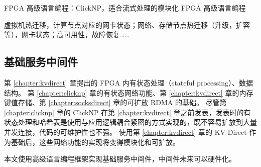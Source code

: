 FPGA 高级语言编程：ClickNP，适合流式处理的模块化 FPGA 高级语言编程

虚拟机热迁移，计算节点对应的网卡状态；网络、存储节点热迁移（升级，扩容等），网卡状态；高可用性，故障恢复……

\subsection{基础服务中间件}



第 \ref{chapter:kvdirect} 章提出的 FPGA 内有状态处理（stateful processing）、数据结构。
第 \ref{chapter:clicknp} 章的有状态网络功能、第 \ref{chapter:kvdirect} 章的内存键值存储、第 \ref{chapter:socksdirect} 章的可扩放 RDMA 的基础。
尽管第 \ref{chapter:clicknp} 章的 ClickNP 在第 \ref{chapter:kvdirect} 章之前发表，发表时的有状态处理和哈希表是使用与应用逻辑耦合紧密的方式实现的，既不容易扩放到大量并发连接，代码的可维护性也不强。
使用第 \ref{chapter:kvdirect} 章的 KV-Direct 作为基础后，这些网络功能的实现将变得模块化和可扩放。

本文使用高级语言编程框架实现基础服务中间件，中间件未来可以硬件化。
